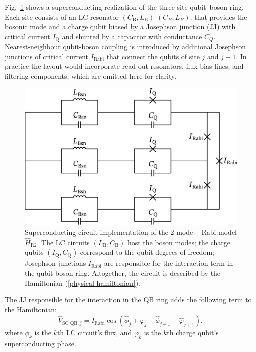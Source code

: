 \documentclass[reprint, aps, prx, amsmath, amssymb, longbibliography, superscriptaddress]{revtex4-2}
\newcommand{\dl}[1]{{\color{red}#1}}
\DeclareMathOperator{\Zthree}{\mathbb{Z}_3}
\begin{document}
Fig.~\ref{fig:superconducting-Rabi} shows a superconducting realization of the three‑site qubit–boson ring. Each site consists of an LC resonator $(C_{\text{B}}, L_{\text{B}})$ 
\dl{$(C_B, L_B)$}.
that provides the bosonic mode and a charge qubit biased by a Josephson junction (JJ) with critical current $I_{\text{Q}}$ and shunted by a capacitor with conductance $C_{Q}$. Nearest‑neighbour qubit-boson coupling is introduced by additional Josephson junctions of critical current $I_{\text{Rabi}}$ \cite{siewert_aspects_2000,rasmussen_controllable_2019,shafranjuk_twoqubit_2006,allman_tunable_2014,hu_controllable_2007} that connect the qubits of site $j$ and $j+1$. In practice the layout would incorporate read‑out resonators, flux‑bias lines, and filtering components, which are omitted here for clarity. 

\begin{figure}[t]
  \includegraphics[width=\linewidth]{pics/SC_Rabi_circuit_svg-tex.pdf}
  \caption{Superconducting circuit implementation of the 2-mode $\Zthree$ Rabi model $\hat H_{\text{R}2}$. The LC circuits $(L_{\text{B}}, C_{\text{B}})$ host the boson modes; the charge qubits $(I_{\text{Q}}, C_{\text{Q}})$ correspond to the qubit degrees of freedom; Josephson junctions $I_{\text{Rabi}}$ are responsible for the interaction term in the qubit-boson ring. Altogether, the circuit is described by the Hamiltonian (\ref{physical-hamiltonian}).}
  \label{fig:superconducting-Rabi}
\end{figure}

The JJ responsible for the interaction in the QB ring adds the following term to the Hamiltonian:
\begin{equation}
    \hat V_{\text{SC QB},j} = I_{\text{Rabi}}\cos(\hat \phi_j + \hat \varphi_j - \hat \phi_{j+1} - \hat \varphi_{j+1}),
\end{equation}
where $\phi_k$ is the $k$th LC circuit's flux, and $\varphi_k$ is the $k$th charge qubit's superconducting phase.
\end{document}
